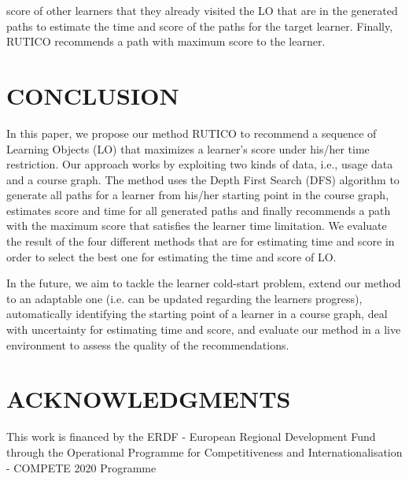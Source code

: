 \documentclass{sig-alternate}
\begin{document}
score of other learners that they already visited the LO that are in the generated paths to estimate the time and score of the paths for the target learner. Finally, RUTICO recommends a path with maximum score to the learner.

\section{CONCLUSION}
\label{sec:conclusion}
\noindent In this paper, we propose our method RUTICO to recommend a sequence of Learning Objects (LO) that maximizes a learner’s score under his/her time restriction. Our approach works by exploiting two kinds of data, i.e., usage data and a course graph. The method uses the Depth First Search (DFS) algorithm to generate all paths for a learner from his/her starting point in the course graph, estimates score and time for all generated paths and finally recommends a path with the maximum score that satisfies the learner time limitation. We evaluate the result of the four different methods that are for estimating time and score in order to select the best one for estimating the time and score of LO.

In the future, we aim to tackle the learner cold-start problem, extend our method to an adaptable one (i.e. can be updated regarding the learners progress), automatically identifying the starting point of a learner in a course graph, deal with uncertainty for estimating time and score, and evaluate our method in a live environment to assess the quality of the recommendations.

\section*{ACKNOWLEDGMENTS}
\label{sec:acknowledgments}
This work is financed by the ERDF - European Regional Development Fund through the Operational Programme for Competitiveness and Internationalisation - COMPETE 2020 Programme
\newpage
\end{document}

